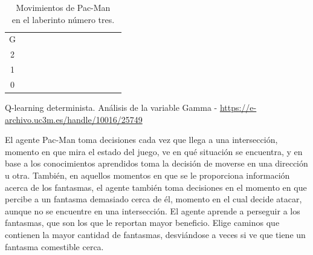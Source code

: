 \documentclass[11pt]{exam}
\begin{document}
\begin{table}[H]
\begin{tabular}{ccccccccccccc}
		\multicolumn{1}{c|}{G} &
		\cellcolor[HTML]{000000} \\ \cline{2-12}
		\multicolumn{1}{c|}{2} &
		\multicolumn{1}{c|}{\cellcolor[HTML]{000000}} &
		\multicolumn{1}{c|}{} &
		\multicolumn{1}{c|}{} &
		\multicolumn{1}{c|}{} &
		\multicolumn{1}{c|}{} &
		\multicolumn{1}{c|}{} &
		\multicolumn{1}{c|}{} &
		\multicolumn{1}{c|}{} &
		\multicolumn{1}{c|}{} &
		\multicolumn{1}{c|}{} &
		\multicolumn{1}{c|}{} &
		\cellcolor[HTML]{000000} \\ \cline{2-12}
		\multicolumn{1}{c|}{1} &
		\multicolumn{1}{c|}{\cellcolor[HTML]{000000}} &
		\multicolumn{1}{c|}{} &
		\multicolumn{1}{c|}{} &
		\multicolumn{1}{c|}{} &
		\multicolumn{1}{c|}{} &
		\multicolumn{1}{c|}{} &
		\multicolumn{1}{c|}{} &
		\multicolumn{1}{c|}{} &
		\multicolumn{1}{c|}{} &
		\multicolumn{1}{c|}{} &
		\multicolumn{1}{c|}{} &
		\cellcolor[HTML]{000000} \\ \cline{2-12}
		\multicolumn{1}{c|}{0} &
		\multicolumn{1}{c|}{\cellcolor[HTML]{000000}} &
		\multicolumn{1}{c|}{\cellcolor[HTML]{000000}} &
		\multicolumn{1}{c|}{\cellcolor[HTML]{000000}} &
		\multicolumn{1}{c|}{\cellcolor[HTML]{000000}} &
		\multicolumn{1}{c|}{\cellcolor[HTML]{000000}} &
		\multicolumn{1}{c|}{\cellcolor[HTML]{000000}} &
		\multicolumn{1}{c|}{\cellcolor[HTML]{000000}} &
		\multicolumn{1}{c|}{\cellcolor[HTML]{000000}} &
		\cellcolor[HTML]{000000}{\color[HTML]{333333} } &
		\cellcolor[HTML]{000000}{\color[HTML]{333333} } &
		\cellcolor[HTML]{000000}{\color[HTML]{333333} } &
		\cellcolor[HTML]{000000}{\color[HTML]{333333} } \\ \cline{2-9}
	\end{tabular}
	\caption{Movimientos de Pac-Man \\ en el laberinto número tres.}
	\label{tabla_lab3}
\end{table}


Q-learning determinista. Análisis de la variable Gamma - \url{https://e-archivo.uc3m.es/handle/10016/25749}

El agente Pac-Man toma decisiones cada vez que llega a una intersección, momento en que mira el estado del juego, ve en qué situación se encuentra, y en base a los conocimientos aprendidos toma la decisión de moverse en una dirección u otra. También, en aquellos momentos en que se le proporciona información acerca de los fantasmas, el agente también toma decisiones en el momento en que percibe a un fantasma demasiado cerca de él, momento en el cual decide atacar, aunque no se encuentre en una intersección. El agente aprende a perseguir a los fantasmas, que son los que le reportan mayor beneficio. Elige caminos que contienen la mayor cantidad de fantasmas, desviándose a veces si ve que tiene un fantasma comestible cerca.
\end{document}
